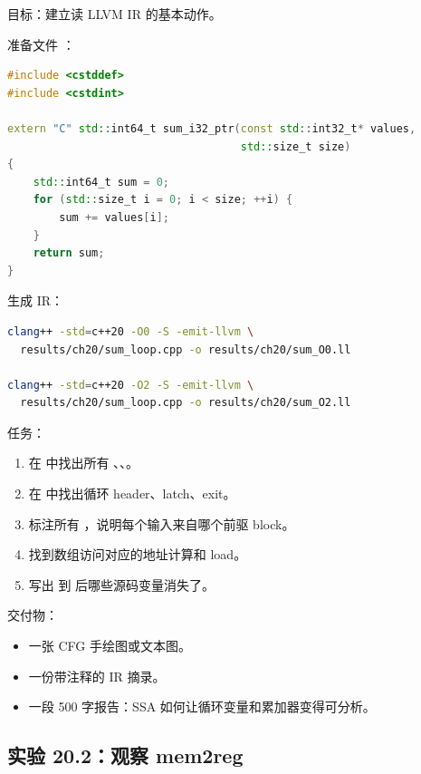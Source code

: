 \begin{labbox}
目标：建立读 LLVM IR 的基本动作。

准备文件 ：

\begin{lstlisting}[language=C++]
#include <cstddef>
#include <cstdint>

extern "C" std::int64_t sum_i32_ptr(const std::int32_t* values,
                                    std::size_t size)
{
    std::int64_t sum = 0;
    for (std::size_t i = 0; i < size; ++i) {
        sum += values[i];
    }
    return sum;
}
\end{lstlisting}

生成 IR：

\begin{lstlisting}[language=bash]
clang++ -std=c++20 -O0 -S -emit-llvm \
  results/ch20/sum_loop.cpp -o results/ch20/sum_O0.ll

clang++ -std=c++20 -O2 -S -emit-llvm \
  results/ch20/sum_loop.cpp -o results/ch20/sum_O2.ll
\end{lstlisting}

任务：

\begin{enumerate}
  \item 在  中找出所有 、、。
  \item 在  中找出循环 header、latch、exit。
  \item 标注所有 \code{phi}，说明每个输入来自哪个前驱 block。
  \item 找到数组访问对应的地址计算和 load。
  \item 写出 \code{-O0} 到 \code{-O2} 后哪些源码变量消失了。
\end{enumerate}

交付物：

\begin{itemize}
  \item 一张 CFG 手绘图或文本图。
  \item 一份带注释的 IR 摘录。
  \item 一段 500 字报告：SSA 如何让循环变量和累加器变得可分析。
\end{itemize}
\end{labbox}

\subsection{实验 20.2：观察 mem2reg}

